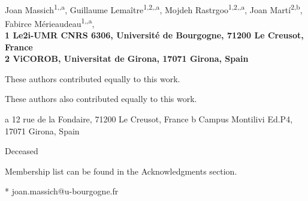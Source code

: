 \vspace*{0.35in}

\begin{flushleft}
{\Large
\textbf{}
}
\newline
\\
Joan Massich\textsuperscript{1,\Yinyang,\textcurrency a},
Guillaume Lema\^{i}tre\textsuperscript{1,2,\Yinyang,\textcurrency a},
Mojdeh Rastrgoo\textsuperscript{1,2,\Yinyang,\textcurrency a},
Joan Mart\'{i}\textsuperscript{2,\textcurrency b},
Fabirce M\'{e}rieaudeau\textsuperscript{1,\ddag,\textcurrency a},
\\
\bigskip
\bf{1} Le2i-UMR CNRS 6306, Universit\'{e} de Bourgogne, 71200 Le Creusot, France
\\
\bf{2} ViCOROB, Universitat de Girona, 17071 Girona, Spain
\\
\bigskip

%
%
\Yinyang These authors contributed equally to this work.

\ddag These authors also contributed equally to this work.

\textcurrency a 12 rue de la Fondaire, 71200 Le Creusot, France
\textcurrency b Campus Montilivi Ed.P4, 17071 Girona, Spain

\dag Deceased

\textpilcrow Membership list can be found in the Acknowledgments section.

* joan.massich@u-bourgogne.fr

\end{flushleft}
